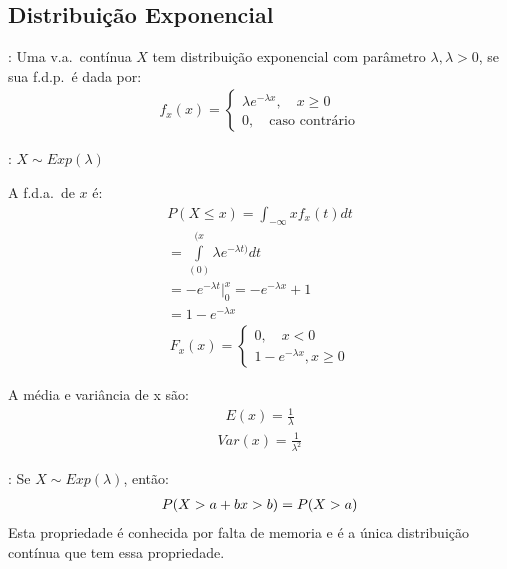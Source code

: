 \subsection{Distribuição Exponencial}
\begin{description}
  \item [Definição]: Uma v.a.\ contínua $X$ tem distribuição exponencial com parâmetro $\lambda, \lambda>0$, se sua
    f.d.p.\ é dada por:
    \begin{align*}
      f_{x} (x)= \begin{cases}
        \lambda e^{- \lambda x} , \quad x \ge 0 \\
        0, \quad \text{caso contrário}
      \end{cases}
    \end{align*}
  \item[Notação]: $X \mathtt{\sim} Exp(\lambda)$
    \begin{figure}[H]
      \centering
      
    \end{figure}
    \item A f.d.a.\ de $x$ é:
      \begin{align*}
        P(X \le x)  = \int_{ -\infty }{x} f_{x}(t)dt \\
        = \int \limits_{(0)}^{(x} \lambda e^{-\lambda t )} dt \\
        = -e^{-\lambda t} |_{0}^{x} = -e^{-\lambda x} +1\\
        = 1- e^{-\lambda x}
      \end{align*}
      \begin{align*}
        F_{x} (x) = \begin{cases}
         0, \quad x<0\\
         1-e^{-\lambda x} , x\ge 0
        \end{cases}
      \end{align*}
    \item A média e variância de x são:
      \begin{align*}
        E(x) = \frac{1}{\lambda}
      \end{align*}
      \begin{align*}
        Var(x) = \frac{1}{\lambda^2}
      \end{align*}
    \item[Propriedade]:
       Se $X \mathtt{\sim}  Exp(\lambda)$, então:
        \begin{align*}
          P(X> a+b  \/ x>b) = P(X > a)
        \end{align*}
        Esta propriedade é conhecida por falta de memoria e é a única distribuição 
        contínua que tem essa propriedade.


\end{description}
